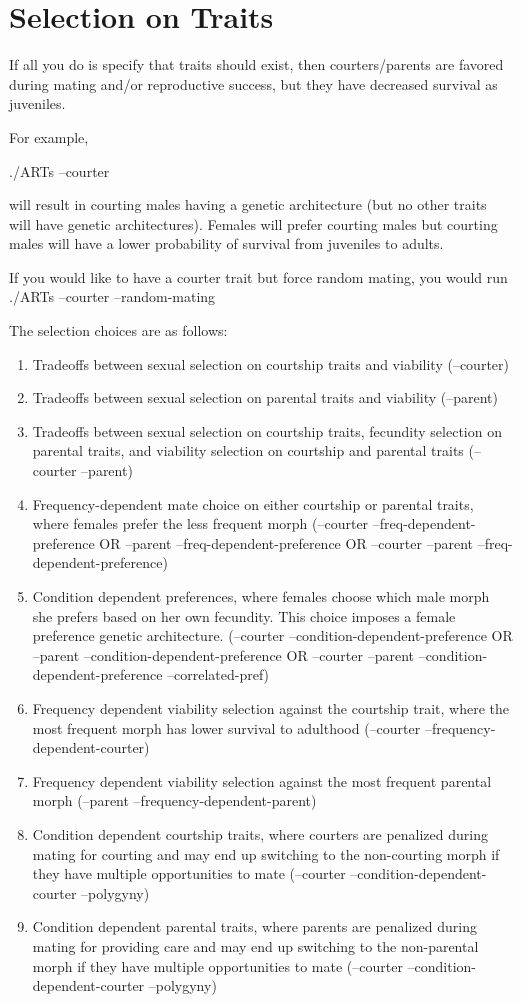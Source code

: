 \documentclass[]{article}
\begin{document}
\section{Selection on Traits}

If all you do is specify that traits should exist, then courters/parents are favored during mating and/or reproductive success, but they have decreased survival as juveniles. 

For example,

./ARTs --courter

will result in courting males having a genetic architecture (but no other traits will have genetic architectures). Females will prefer courting males but courting males will have a lower probability of survival from juveniles to adults.

If you would like to have a courter trait but force random mating, you would run
./ARTs --courter --random-mating

The selection choices are as follows:
\begin{enumerate}
	\item Tradeoffs between sexual selection on courtship traits and viability (--courter)
	\item Tradeoffs between sexual selection on parental traits and viability (--parent)
	\item Tradeoffs between sexual selection on courtship traits, fecundity selection on parental traits, and viability selection on courtship and parental traits (--courter --parent)
	\item Frequency-dependent mate choice on either courtship or parental traits, where females prefer the less frequent morph (--courter --freq-dependent-preference OR --parent --freq-dependent-preference OR --courter --parent --freq-dependent-preference)
	\item Condition dependent preferences, where females choose which male morph she prefers based on her own fecundity. This choice imposes a female preference genetic architecture. (--courter --condition-dependent-preference OR --parent --condition-dependent-preference OR --courter --parent --condition-dependent-preference --correlated-pref)
	\item Frequency dependent viability selection against the courtship trait, where the most frequent morph has lower survival to adulthood (--courter --frequency-dependent-courter)
	\item Frequency dependent viability selection against the most frequent parental morph (--parent --frequency-dependent-parent)
	\item Condition dependent courtship traits, where courters are penalized during mating for courting and may end up switching to the non-courting morph if they have multiple opportunities to mate (--courter --condition-dependent-courter --polygyny)
	\item Condition dependent parental traits, where parents are penalized during mating for providing care and may end up switching to the non-parental morph if they have multiple opportunities to mate (--courter --condition-dependent-courter --polygyny)
\end{enumerate}
\end{document}
